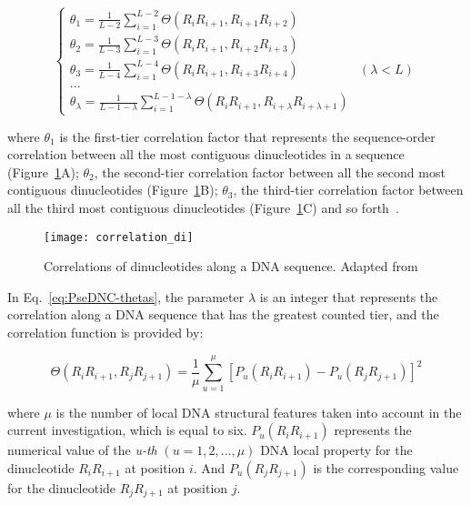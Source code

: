\begin{equation}\label{eq:PseDNC-thetas}
    \begin{cases}
    \theta_{1} = \frac{1}{L-2} \sum_{i=1}^{L-2}\Theta(R_{i}R_{i+1}, R_{i+1}R_{i+2})
    \\ 
    \theta_{2} = \frac{1}{L-3} \sum_{i=1}^{L-3}\Theta(R_{i}R_{i+1}, R_{i+2}R_{i+3})
    \\ 
    \theta_{3} = \frac{1}{L-4} \sum_{i=1}^{L-4}\Theta(R_{i}R_{i+1}, R_{i+3}R_{i+4}) & (\lambda < L)
    \\
    ...
    \\ 
    \theta_{\lambda} = \frac{1}{L-1-\lambda} \sum_{i=1}^{L-1-\lambda}\Theta(R_{i}R_{i+1}, R_{i+\lambda}R_{i+\lambda+1})
    \end{cases}
\end{equation}

\noindent where $\theta_{1}$ is the first-tier correlation factor that represents the sequence-order correlation between all the most contiguous dinucleotides in a sequence (Figure~\ref{fig:psednc_correlation}A); $\theta_{2}$, the second-tier correlation factor between all the second most contiguous dinucleotides (Figure~\ref{fig:psednc_correlation}B); $\theta_{3}$, the third-tier correlation factor between all the third most contiguous dinucleotides (Figure~\ref{fig:psednc_correlation}C) and so forth~\cite{Chen2013IRSpot-PseDNC:Composition}.

\begin{figure}[htbp]
    \centering
    \texttt{[image: correlation\_di]}
    \caption{Correlations of dinucleotides along a DNA sequence. Adapted from~\cite{Chen2013IRSpot-PseDNC:Composition}}
    \label{fig:psednc_correlation}
\end{figure}


In Eq.~\ref{eq:PseDNC-thetas}, the parameter $\lambda$ is an integer that represents the correlation along a \gls{DNA} sequence that has the greatest counted tier, and the correlation function is provided by:

\begin{equation}\label{eq:PseDNC-5}
    \Theta(R_{i}R_{i+1}, R_{j}R_{j+1}) = \frac{1}{\mu}\sum_{u=1}^{\mu}[P_{u} (R_{i}R_{i+1}) - P_{u}(R_{j}R_{j+1})]^{2}
\end{equation}

\noindent where $\mu$ is the number of local \gls{DNA} structural features taken into account in the current investigation, which is equal to six. $P_{u} (R_{i}R_{i+1})$ represents the numerical value of the \textit{u-th} $(u = 1,2,...,\mu)$ \gls{DNA} local property for the dinucleotide $R_{i}R_{i+1}$ at position $i$. And $P_{u}(R_{j}R_{j+1})$ is the corresponding value for the dinucleotide $R_{j}R_{j+1}$ at position $j$.

